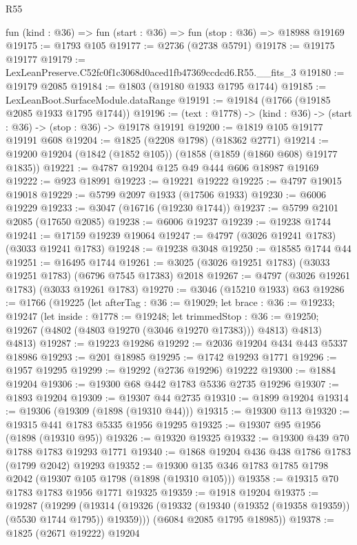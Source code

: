 \begin{lexlean}{R55}
\begin{coremodule}
  fun (kind : @36) => fun (start : @36) => fun (stop : @36) => @18988 @19169
@19175 := @1793 @105
@19177 := @2736 (@2738 @5791)
@19178 := @19175 @19177
@19179 := LexLeanPreserve.C52fc0f1c3068d0aced1fb47369ccdcd6.R55.__fits_3
@19180 := @19179 @2085
@19184 := @1803 (@19180 @1933 @1795 @1744)
@19185 := LexLeanBoot.SurfaceModule.dataRange
@19191 := @19184 (@1766 (@19185 @2085 @1933 @1795 @1744))
@19196 := (text : @1778) -> (kind : @36) -> (start : @36) -> (stop : @36) -> @19178 @19191
@19200 := @1819 @105 @19177 @19191 @608
@19204 := @1825 (@2208 @1798) (@18362 @2771)
@19214 := @19200 @19204 (@1842 (@1852 @105)) (@1858 (@1859 (@1860 @608) @19177 @1835))
@19221 := @4787 @19204 @125 @49 @444 @606 @18987 @19169
@19222 := @923 @18991
@19223 := @19221 @19222
@19225 := @4797 @19015 @19018
@19229 := @5799 @2097 @1933 (@17506 @1933)
@19230 := @6006 @19229
@19233 := @3047 (@16716 (@19230 @1744))
@19237 := @5799 @2101 @2085 (@17650 @2085)
@19238 := @6006 @19237
@19239 := @19238 @1744
@19241 := @17159 @19239 @19064
@19247 := @4797 (@3026 @19241 @1783) (@3033 @19241 @1783)
@19248 := @19238 @3048
@19250 := @18585 @1744 @44
@19251 := @16495 @1744
@19261 := @3025 (@3026 @19251 @1783) (@3033 @19251 @1783) (@6796 @7545 @17383) @2018
@19267 := @4797 (@3026 @19261 @1783) (@3033 @19261 @1783)
@19270 := @3046 (@15210 @1933) @63
@19286 := @1766
    (@19225
      (let afterTag : @36 := @19029;
      let brace : @36 := @19233;
      @19247
        (let inside : @1778 := @19248;
        let trimmedStop : @36 := @19250; @19267 (@4802 (@4803 @19270 (@3046 @19270 @17383))) @4813)
        @4813)
      @4813)
@19287 := @19223 @19286
@19292 := @2036 @19204 @434 @443 @5337 @18986
@19293 := @201 @18985
@19295 := @1742 @19293 @1771
@19296 := @1957 @19295
@19299 := @19292 (@2736 @19296) @19222
@19300 := @1884 @19204
@19306 := @19300 @68 @442 @1783 @5336 @2735 @19296
@19307 := @1893 @19204
@19309 := @19307 @44 @2735
@19310 := @1899 @19204
@19314 := @19306 (@19309 (@1898 (@19310 @44)))
@19315 := @19300 @113
@19320 := @19315 @441 @1783 @5335 @1956 @19295
@19325 := @19307 @95 @1956 (@1898 (@19310 @95))
@19326 := @19320 @19325
@19332 := @19300 @439 @70 @1788 @1783 @19293 @1771
@19340 := @1868 @19204 @436 @438 @1786 @1783 (@1799 @2042) @19293
@19352 := @19300 @135 @346 @1783 @1785 @1798 @2042 (@19307 @105 @1798 (@1898 (@19310 @105)))
@19358 := @19315 @70 @1783 @1783 @1956 @1771 @19325
@19359 := @1918 @19204
@19375 := @19287
    (@19299
      (@19314 (@19326 (@19332 (@19340 (@19352 (@19358 @19359)) (@5530 @1744 @1795)) @19359)))
      (@6084 @2085 @1795 @18985))
@19378 := @1825 (@2671 @19222) @19204

\end{coremodule}
\end{lexlean}

